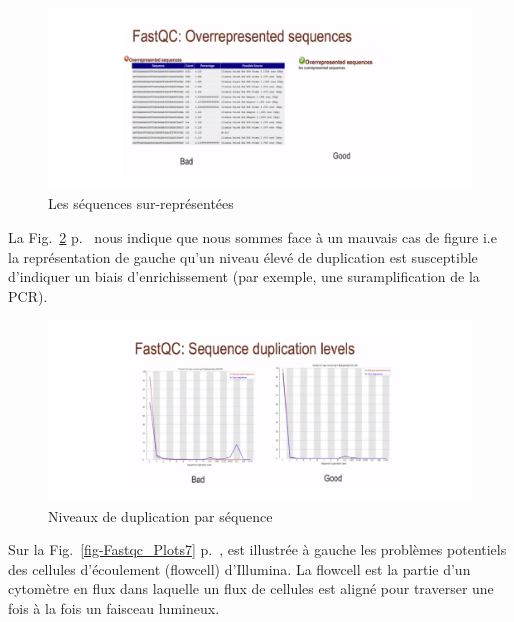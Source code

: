 \documentclass[a4paper,11pt]{article}
\begin{document}
\begin{figure}
  \begin{center}
    \includegraphics[width=16cm]{Images/Fastqc_Plots5}
  \end{center}
  \caption{Les séquences sur-représentées}
  \label{fig-Fastqc_Plots5}
\end{figure}

La Fig.~\ref{fig-Fastqc_Plots6} p.~\pageref{fig-Fastqc_Plots6} nous
indique que nous sommes face à un mauvais cas de figure i.e la
représentation de gauche qu'un niveau élevé de duplication est
susceptible d'indiquer un biais d'enrichissement (par exemple, une
suramplification de la PCR).

\begin{figure}
  \begin{center}
    \includegraphics[width=16cm]{Images/Fastqc_Plots6}
  \end{center}
  \caption{Niveaux de duplication par séquence}
  \label{fig-Fastqc_Plots6}
\end{figure}

Sur la Fig.~\ref{fig-Fastqc_Plots7} p.~\pageref{fig-Fastqc_Plots7},
est illustrée à gauche les problèmes potentiels des cellules
d'écoulement (flowcell) d'Illumina. La flowcell est la partie d'un
cytomètre en flux dans laquelle un flux de cellules est aligné pour
traverser une fois à la fois un faisceau lumineux.
\end{document}
